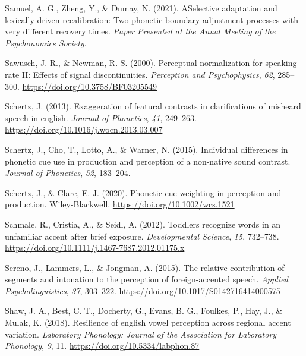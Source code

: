 \documentclass[
  11pt,
  man,floatsintext]{apa6}
\newlength{\cslhangindent}
\newlength{\cslentryspacingunit} %
\newenvironment{CSLReferences}[2] %
 {%
  \setlength{\parindent}{0pt}
  \ifodd #1
  \let\oldpar\par
  \def\par{\hangindent=\cslhangindent\oldpar}
  \fi
  \setlength{\parskip}{#2\cslentryspacingunit}
 }%
 {}
\begin{document}
\begin{CSLReferences}{1}{0}
\leavevmode{}%
Samuel, A. G., Zheng, Y., \& Dumay, N. (2021). ASelective adaptation and lexically-driven recalibration: Two phonetic boundary adjustment processes with very different recovery times. \emph{Paper Presented at the Anual Meeting of the Psychonomics Society}.

\leavevmode{}%
Sawusch, J. R., \& Newman, R. S. (2000). Perceptual normalization for speaking rate II: Effects of signal discontinuities. \emph{Perception and Psychophysics}, \emph{62}, 285--300. \url{https://doi.org/10.3758/BF03205549}

\leavevmode{}%
Schertz, J. (2013). Exaggeration of featural contrasts in clarifications of misheard speech in english. \emph{Journal of Phonetics}, \emph{41}, 249--263. \url{https://doi.org/10.1016/j.wocn.2013.03.007}

\leavevmode{}%
Schertz, J., Cho, T., Lotto, A., \& Warner, N. (2015). Individual differences in phonetic cue use in production and perception of a non-native sound contrast. \emph{Journal of Phonetics}, \emph{52}, 183--204.

\leavevmode{}%
Schertz, J., \& Clare, E. J. (2020). Phonetic cue weighting in perception and production. Wiley-Blackwell. \url{https://doi.org/10.1002/wcs.1521}

\leavevmode{}%
Schmale, R., Cristia, A., \& Seidl, A. (2012). Toddlers recognize words in an unfamiliar accent after brief exposure. \emph{Developmental Science}, \emph{15}, 732--738. \url{https://doi.org/10.1111/j.1467-7687.2012.01175.x}

\leavevmode{}%
Sereno, J., Lammers, L., \& Jongman, A. (2015). The relative contribution of segments and intonation to the perception of foreign-accented speech. \emph{Applied Psycholinguistics}, \emph{37}, 303--322. \url{https://doi.org/10.1017/S0142716414000575}

\leavevmode{}%
Shaw, J. A., Best, C. T., Docherty, G., Evans, B. G., Foulkes, P., Hay, J., \& Mulak, K. (2018). Resilience of english vowel perception across regional accent variation. \emph{Laboratory Phonology: Journal of the Association for Laboratory Phonology}, \emph{9}, 11. \url{https://doi.org/10.5334/labphon.87}


\end{CSLReferences}
\end{document}
